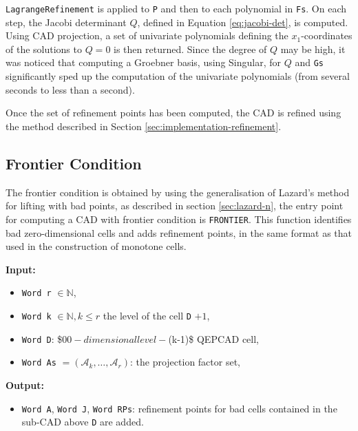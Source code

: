 \documentclass[
]{book}
\providecommand{\tightlist}{%
  \setlength{\itemsep}{0pt}\setlength{\parskip}{0pt}}
\theoremstyle{definition}
\theoremstyle{definition}
\theoremstyle{definition}
\theoremstyle{definition}
\theoremstyle{remark}
\begin{document}
\texttt{LagrangeRefinement} is applied to \texttt{P} and then to each polynomial in \texttt{Fs}. On each step, the Jacobi determinant \(Q\), defined in Equation \eqref{eq:jacobi-det}, is computed. Using CAD projection, a set of univariate polynomials defining the \(x_1\)-coordinates of the solutions to \(Q = 0\) is then returned. Since the degree of \(Q\) may be high, it was noticed that computing a Groebner basis, using Singular, for \(Q\) and \texttt{Gs} significantly sped up the computation of the univariate polynomials (from several seconds to less than a second).

Once the set of refinement points has been computed, the CAD is refined using the method described in Section \ref{sec:implementation-refinement}.

\hypertarget{frontier-condition}{%
\subsection{Frontier Condition}\label{frontier-condition}}

The frontier condition is obtained by using the generalisation of Lazard's method for lifting with bad points, as described in section \ref{sec:lazard-n}, the entry point for computing a CAD with frontier condition is \texttt{FRONTIER}. This function identifies bad zero-dimensional cells and adds refinement points, in the same format as that used in the construction of monotone cells.

\textbf{Input:}

\begin{itemize}
\tightlist
\item
  \texttt{Word\ r} \(\in \mathbb{N}\),
\item
  \texttt{Word\ k} \(\in \mathbb{N}, k \le r\) the level of the cell \texttt{D} \(+ 1\),
\item
  \texttt{Word\ D}: \$0\(0-dimensional level-\)(k-1)\$ QEPCAD cell,
\item
  \texttt{Word\ As} \(= (\mathcal{A}_k,\ldots,\mathcal{A}_r)\): the projection factor set,
\end{itemize}

\textbf{Output:}

\begin{itemize}
\tightlist
\item
  \texttt{Word\ A}, \texttt{Word\ J}, \texttt{Word\ RPs}: refinement points for bad cells contained in the sub-CAD above \texttt{D} are added.
\end{itemize}
\end{document}
